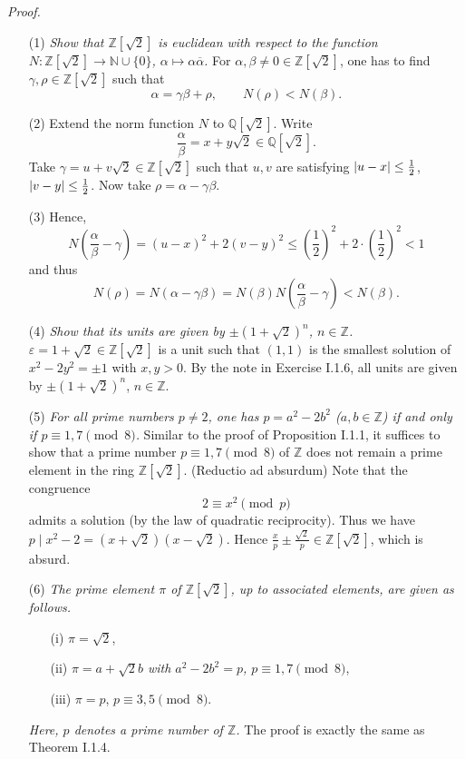 \documentclass{article}
\begin{document}
\emph{Proof.}
\begin{enumerate}
\item[(1)]
  \emph{Show that $\mathbb{Z}[\sqrt{2}]$ is euclidean with respect to the function
  $N: \mathbb{Z}[\sqrt{2}] \to \mathbb{N} \cup \{0\}$, $\alpha \mapsto \alpha \overline{\alpha}$.}
  For $\alpha, \beta \neq 0 \in \mathbb{Z}[\sqrt{2}]$,
  one has to find $\gamma, \rho \in \mathbb{Z}[\sqrt{2}]$
  such that
  \[
    \alpha = \gamma\beta + \rho,
    \qquad
    N(\rho) < N(\beta).
  \]

\item[(2)]
  Extend the norm function $N$ to $\mathbb{Q}[\sqrt{2}]$.
  Write
  \[
    \frac{\alpha}{\beta} = x + y\sqrt{2} \in \mathbb{Q}[\sqrt{2}].
  \]
  Take $\gamma = u + v\sqrt{2} \in \mathbb{Z}[\sqrt{2}]$
  such that $u, v$ are satisfying $\abs{u - x} \leq \frac{1}{2}$, $\abs{v - y} \leq \frac{1}{2}$.
  Now take $\rho = \alpha - \gamma\beta$.

\item[(3)]
  Hence,
  \[
    N\left(\frac{\alpha}{\beta} - \gamma\right)
    = (u-x)^2 + 2 (v-y)^2
    \leq \left(\frac{1}{2}\right)^{2} + 2 \cdot \left(\frac{1}{2}\right)^{2}
    < 1
  \]
  and thus
  \[
    N(\rho)
    = N(\alpha - \gamma\beta)
    = N(\beta) N\left(\frac{\alpha}{\beta} - \gamma\right)
    < N(\beta).
  \]

\item[(4)]
  \emph{Show that its units are given by $\pm(1+\sqrt{2})^n$, $n \in \mathbb{Z}$.}
  $\varepsilon = 1 + \sqrt{2} \in \mathbb{Z}[\sqrt{2}]$ is a unit such that
  $(1,1)$ is the smallest solution of $x^2 - 2y^2 = \pm 1$ with $x, y > 0$.
  By the note in Exercise I.1.6,
  all units are given by $\pm(1+\sqrt{2})^n$, $n \in \mathbb{Z}$.

\item[(5)]
  \emph{For all prime numbers $p \neq 2$, one has
  $p = a^2 - 2b^2$ ($a, b \in \mathbb{Z}$) if and only if $p \equiv 1, 7 \pmod 8$.}
  Similar to the proof of Proposition I.1.1,
  it suffices to show that a prime number $p \equiv 1, 7 \pmod 8$ of $\mathbb{Z}$
  does not remain a prime element in the ring $\mathbb{Z}[\sqrt{2}]$.
  (Reductio ad absurdum)
  Note that the congruence
  \[
    2 \equiv x^2 \pmod p
  \]
  admits a solution (by the law of quadratic reciprocity).
  Thus we have $p \mid x^2 - 2 = (x + \sqrt{2})(x - \sqrt{2})$.
  Hence $\frac{x}{p} \pm \frac{\sqrt{2}}{p} \in \mathbb{Z}[\sqrt{2}]$, which is absurd.

\item[(6)]
  \emph{The prime element $\pi$ of $\mathbb{Z}[\sqrt{2}]$, up to associated elements,
  are given as follows.}
  \begin{enumerate}
  \item[(i)]
    $\pi = \sqrt{2}$,

  \item[(ii)]
    \emph{$\pi = a + \sqrt{2}b$ with $a^2 - 2b^2 = p$, $p \equiv 1, 7 \pmod 8$},

  \item[(iii)]
    $\pi = p$, $p \equiv 3, 5 \pmod 8$.
  \end{enumerate}
  \emph{Here, $p$ denotes a prime number of $\mathbb{Z}$.}
  The proof is exactly the same as Theorem I.1.4.
\end{enumerate}
\end{document}
